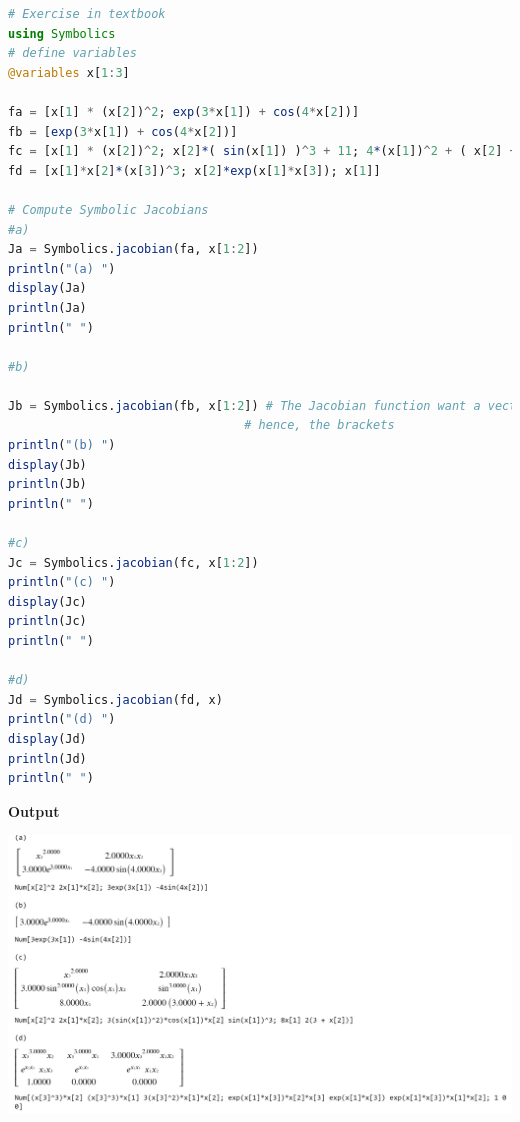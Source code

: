 \begin{lstlisting}[language=Julia,style=mystyle]
# Exercise in textbook
using Symbolics
# define variables 
@variables x[1:3]

fa = [x[1] * (x[2])^2; exp(3*x[1]) + cos(4*x[2])]
fb = [exp(3*x[1]) + cos(4*x[2])]
fc = [x[1] * (x[2])^2; x[2]*( sin(x[1]) )^3 + 11; 4*(x[1])^2 + ( x[2] +3 )^2]
fd = [x[1]*x[2]*(x[3])^3; x[2]*exp(x[1]*x[3]); x[1]]

# Compute Symbolic Jacobians
#a)
Ja = Symbolics.jacobian(fa, x[1:2])
println("(a) ")
display(Ja)
println(Ja)
println(" ")

#b)

Jb = Symbolics.jacobian(fb, x[1:2]) # The Jacobian function want a vector
                                 # hence, the brackets
println("(b) ")
display(Jb)
println(Jb)
println(" ")

#c)
Jc = Symbolics.jacobian(fc, x[1:2])
println("(c) ")
display(Jc)
println(Jc)
println(" ")

#d)
Jd = Symbolics.jacobian(fd, x)
println("(d) ")
display(Jd)
println(Jd)
println(" ")
\end{lstlisting}
\textbf{Output} 
\begin{center}
    \includegraphics[width=0.95\columnwidth]{graphics/Chap05/ScreenshotJacobianOutputV01.png}
\end{center}


